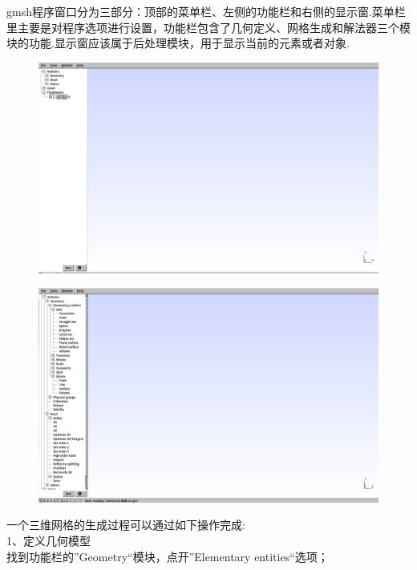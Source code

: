 \documentclass[12pt]{article}
\begin{document}
\begin{CJK}{UTF8}{gkai}
	gmsh程序窗口分为三部分：顶部的菜单栏、左侧的功能栏和右侧的显示窗.菜单栏里主要是对程序选项进行设置，功能栏包含了几何定义、网格生成和解法器三个模块的功能.显示窗应该属于后处理模块，用于显示当前的元素或者对象.\\
	\begin{figure}[H]
		\centering
		\includegraphics[width=14cm]{quanju1.png}
		\caption{}  		
	\end{figure}
	\begin{figure}[H]
		\centering
		\includegraphics[width=14cm]{quanju.png}
		\caption{}  		
	\end{figure}
	
	一个三维网格的生成过程可以通过如下操作完成:\\
	
	1、定义几何模型\\
	
	找到功能栏的”Geometry“模块，点开”Elementary entities“选项；\\
	

\end{CJK}
\end{document}
